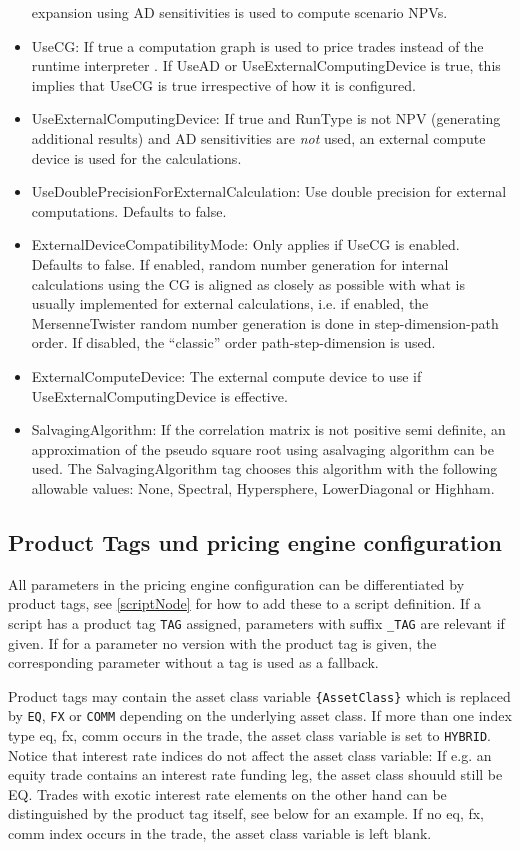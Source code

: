 \begin{itemize}
  expansion using AD sensitivities is used to compute scenario NPVs.
\item UseCG: If true a computation graph is used to price trades instead of the runtime interpreter . If UseAD or
  UseExternalComputingDevice is true, this implies that UseCG is true irrespective of how it is configured.
\item UseExternalComputingDevice: If true and RunType is not NPV (generating additional results) and AD sensitivities
  are {\em not} used, an external compute device is used for the calculations.
\item UseDoublePrecisionForExternalCalculation: Use double precision for external computations. Defaults to false.
\item ExternalDeviceCompatibilityMode: Only applies if UseCG is enabled. Defaults to false. If enabled, random number
  generation for internal calculations using the CG is aligned as closely as possible with what is usually implemented
  for external calculations, i.e. if enabled, the MersenneTwister random number generation is done in
  step-dimension-path order. If disabled, the ``classic'' order path-step-dimension is used.
\item ExternalComputeDevice: The external compute device to use if UseExternalComputingDevice is effective.
\item SalvagingAlgorithm: If the correlation matrix is not positive semi definite, an approximation of the pseudo square root using asalvaging algorithm can be used.
 The SalvagingAlgorithm tag chooses this algorithm with the following allowable values: None, Spectral, Hypersphere, LowerDiagonal or Highham.

\end{itemize}

\subsection{Product Tags und pricing engine configuration}\label{producttags_engineconfig}

All parameters in the pricing engine configuration can be differentiated by product tags, see \ref{scriptNode} for how
to add these to a script definition. If a script has a product tag \verb+TAG+ assigned, parameters with suffix
\verb+_TAG+ are relevant if given. If for a parameter no version with the product tag is given, the corresponding
parameter without a tag is used as a fallback.

Product tags may contain the asset class variable \verb+{AssetClass}+ which is replaced by \verb+EQ+, \verb+FX+ or
\verb+COMM+ depending on the underlying asset class. If more than one index type eq, fx, comm occurs in the trade, the
asset class variable is set to \verb+HYBRID+. Notice that interest rate indices do not affect the asset class variable:
If e.g. an equity trade contains an interest rate funding leg, the asset class shouuld still be EQ. Trades with exotic
interest rate elements on the other hand can be distinguished by the product tag itself, see below for an example. If no
eq, fx, comm index occurs in the trade, the asset class variable is left blank.

